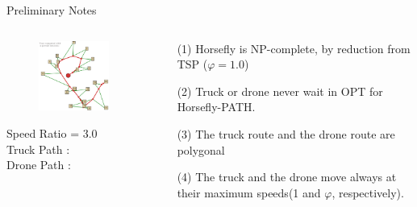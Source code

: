 \documentclass{beamer}
\begin{document}
\begin{frame}{Preliminary Notes}
    \begin{columns}
    \begin{column}{0.5\textwidth}
      \vspace{-19pt}
    \begin{figure}
      \includegraphics[width=6cm]{slide_imgs/horsefly_demo_output.jpg}
    \end{figure}

    
    {\small
      \vspace{-15pt}
      \hspace{40pt} Speed Ratio \varphi = 3.0 \\
      \hspace{40pt} Truck Path :   \\
      \hspace{40pt} Drone Path :   \\
     } 
    \end{column}

   \begin{column}{0.5\textwidth}
      \begin{itemize}
       \item[(1)] Horsefly is {\color{red} NP-complete}, by reduction from TSP ($\varphi = 1.0$)
       \item[(2)] Truck or drone {\color{red} never wait} in OPT for Horsefly-PATH. 
       \item[(3)] The truck route and the drone route are {\color{red} polygonal}
       \item[(4)] The truck and the drone move always at their {\color{red} maximum speeds}(1 and $\varphi$, respectively).
      \end{itemize}
    \end{column}
    
  \end{columns}
       
\end{frame}
\end{document}
